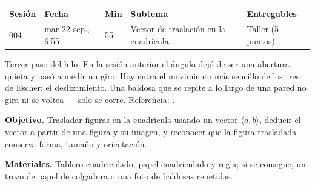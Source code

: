 \documentclass[11pt]{article}
\begin{document}
\encabezado*

\begin{center}
{\renewcommand{\arraystretch}{1.3}
\begin{tabularx}{\linewidth}{@{}l l l X l@{}}
  \toprule
  \textbf{Sesión} & \textbf{Fecha} & \textbf{Min} & \textbf{Subtema} & \textbf{Entregables}\\
  \midrule
  004 & mar 22 sep., 6:55 & 55 & Vector de traslación en la cuadrícula & Taller (5 puntos)\\
  \bottomrule
\end{tabularx}}
\end{center}

Tercer paso del hilo. En la sesión anterior el ángulo dejó de ser una abertura quieta y pasó a
medir un giro. Hoy entra el movimiento más sencillo de los tres de Escher: el deslizamiento.
Una baldosa que se repite a lo largo de una pared no gira ni se voltea — solo se corre.
Referencia: .


\textbf{Objetivo.} Trasladar figuras en la cuadrícula usando un vector $\langle a, b\rangle$,
deducir el vector a partir de una figura y su imagen, y reconocer que la figura trasladada
conserva forma, tamaño y orientación.

\textbf{Materiales.} Tablero cuadriculado; papel cuadriculado y regla; si se consigue, un
trozo de papel de colgadura o una foto de baldosas repetidas.
\end{document}
